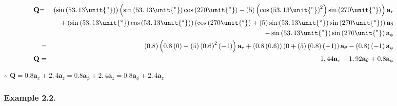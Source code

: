 \documentclass{article}
\begin{document}
\begin{eqnarray*}
\mathbf{Q} &\mathbf{=}&\left( \sin \left( 53.\,\allowbreak 13\unit{%
{{}^\circ}%
}\right) \right) \left( \sin \left( 53.\,\allowbreak 13\unit{%
{{}^\circ}%
}\right) \cos \left( 270\unit{%
{{}^\circ}%
}\right) -\left( 5\right) \left( \cos \left( 53.\,\allowbreak 13\unit{%
{{}^\circ}%
}\right) ^{2}\right) \sin \left( 270\unit{%
{{}^\circ}%
}\right) \right) \mathbf{a}_{r} \\
&&+\left( \sin \left( 53.\,\allowbreak 13\unit{%
{{}^\circ}%
}\right) \cos \left( 53.\,\allowbreak 13\unit{%
{{}^\circ}%
}\right) \right) \left( \cos \left( 270\unit{%
{{}^\circ}%
}\right) +\left( 5\right) \sin \left( 53.\,\allowbreak 13\unit{%
{{}^\circ}%
}\right) \sin \left( 270\unit{%
{{}^\circ}%
}\right) \right) \mathbf{a}_{\theta } \\
&&-\sin \left( 53.\,\allowbreak 13\unit{%
{{}^\circ}%
}\right) \sin \left( 270\unit{%
{{}^\circ}%
}\right) \mathbf{a}_{\phi } \\
&=&\left( 0.8\right) \left( 0.8\left( 0\right) -\left( 5\right) \left(
0.6\right) ^{2}\left( -1\right) \right) \mathbf{a}_{r}+\left( 0.8\left(
0.6\right) \right) \left( 0+\left( 5\right) \left( 0.8\right) \left(
-1\right) \right) \mathbf{a}_{\theta }-\left( 0.8\right) \left( -1\right) 
\mathbf{a}_{\phi } \\
\mathbf{Q} &=&1.\,\allowbreak 44\mathbf{a}_{r}-1.\,\allowbreak 92\mathbf{a}%
_{\theta }+0.8\mathbf{a}_{\phi }
\end{eqnarray*}

$\therefore $ $\mathbf{Q=}0.8\mathbf{a}_{x}+2.\,\allowbreak 4\mathbf{a}%
_{z}=0.8\mathbf{a}_{\phi }+2.\,\allowbreak 4\mathbf{a}_{z}=0.8\mathbf{a}%
_{\phi }+2.\,\allowbreak 4\mathbf{a}_{z}$

\bigskip

\subsubsection{Example 2.2.}
\end{document}

